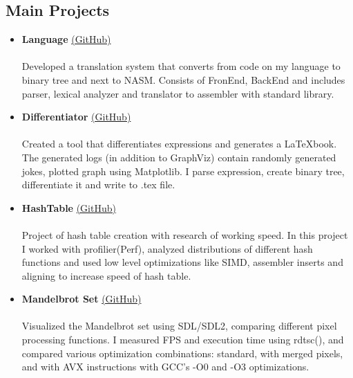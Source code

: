 \documentclass[margin,line]{resume}
\begin{document}
\begin{resume}
    \section{\mysidestyle Main  Projects}
    \begin{itemize}
   		\item[\ding{114}] \textbf{\textsf{Language}} \href{https://github.com/khmelnitskiianton/Language}{(GitHub)} \vspace{2pt} \\
             \space {} \space {} \vspace{4pt} \\
            Developed a translation system that converts from code on my language to binary tree and next to NASM. Consists of FronEnd, BackEnd and includes parser, lexical analyzer and translator to assembler with standard library.
            \item[\ding{114}] \textbf{\textsf{Differentiator}} \href{https://github.com/khmelnitskiianton/Differentiator}{(GitHub)} \vspace{2pt} \\
             \space {}  \space \mytcbox{\LaTeX} \vspace{4pt} \\
            Created a tool that differentiates expressions and generates a \LaTeX \space book. The generated logs (in addition to GraphViz) contain randomly generated jokes, plotted graph using Matplotlib. I parse expression, create binary tree, differentiate it and write to .tex file.
            \item[\ding{114}] \textbf{\textsf{HashTable}} \href{https://github.com/khmelnitskiianton/HashTable}{(GitHub)} \vspace{2pt} \\
             \space {}  \space {} \vspace{4pt} \\
            Project of hash table creation with research of working speed. In this project I worked with profilier(Perf), analyzed distributions of different hash functions and used low level optimizations like SIMD, assembler inserts and aligning to increase speed of hash table.
            \item[\ding{114}] \textbf{\textsf{Mandelbrot Set}} \href{https://github.com/khmelnitskiianton/AsmCx86}{(GitHub)} \vspace{2pt} \\
             \space {} \space {} \vspace{4pt} \\
            Visualized the Mandelbrot set using SDL/SDL2, comparing different pixel processing functions. I measured FPS and execution time using rdtsc(), and compared various optimization combinations: standard, with merged pixels, and with AVX instructions with GCC's -O0 and -O3 optimizations.
    \end{itemize}


\end{resume}
\end{document}
